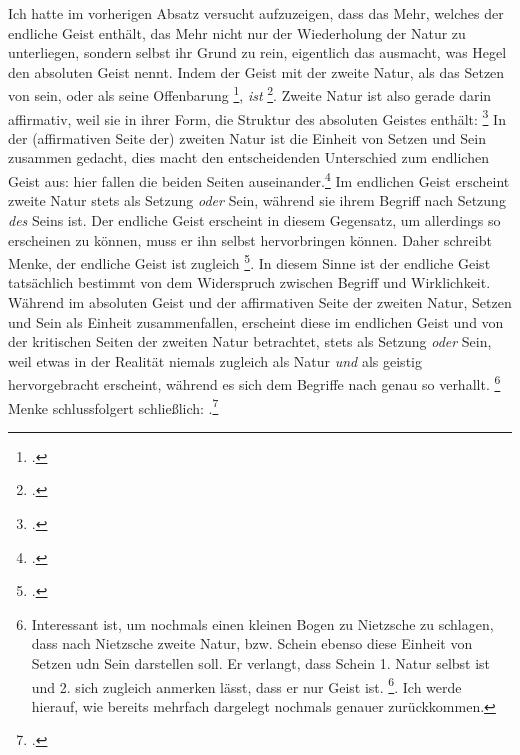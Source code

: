 \documentclass[12pt, a4paper, openany]{report}
\begin{document}
Ich hatte im vorherigen Absatz versucht aufzuzeigen, dass das Mehr, welches der endliche Geist enthält, das Mehr nicht nur der Wiederholung der Natur zu unterliegen, sondern selbst ihr Grund zu rein, eigentlich das ausmacht, was Hegel den absoluten Geist nennt.
Indem der Geist mit der zweite Natur, als das Setzen von sein, oder als seine Offenbarung \footcite[][§ 384, S. 29]{hegel_enzyklopädie_1969}, \emph{ist} \footcite[][144]{menke_autonomie_2018}.
Zweite Natur ist also gerade darin affirmativ, weil sie in ihrer Form, die Struktur des absoluten Geistes enthält: 
\footcite[][§ 384, S. 29]{hegel_enzyklopädie_1969}
In der (affirmativen Seite der) zweiten Natur ist die Einheit von Setzen und Sein zusammen gedacht, dies macht den entscheidenden Unterschied zum endlichen Geist aus: hier fallen die beiden Seiten auseinander.\footcite[Vgl.][S. 143 - S. 144]{menke_autonomie_2018}
Im endlichen Geist erscheint zweite Natur stets als Setzung \emph{oder} Sein, während sie ihrem Begriff nach Setzung \emph{des} Seins ist. 
Der endliche Geist erscheint in diesem Gegensatz, um allerdings so erscheinen zu können, muss er ihn selbst hervorbringen können. 
Daher schreibt Menke, der endliche Geist ist zugleich \footcite[][144]{menke_autonomie_2018}.
In diesem Sinne ist der endliche Geist tatsächlich bestimmt von dem Widerspruch zwischen Begriff und Wirklichkeit. 
Während im absoluten Geist und der affirmativen Seite der zweiten Natur, Setzen und Sein  als Einheit zusammenfallen, erscheint diese im endlichen Geist und von der kritischen Seiten der zweiten Natur betrachtet, stets als Setzung \emph{oder} Sein, weil etwas in der Realität niemals zugleich als Natur \emph{und} als geistig hervorgebracht erscheint, während es sich dem Begriffe nach genau so verhallt.
\footnote{
    Interessant ist, um nochmals einen kleinen Bogen zu Nietzsche zu schlagen, dass nach Nietzsche zweite Natur, bzw. Schein ebenso diese Einheit von Setzen udn Sein darstellen soll.
    Er verlangt, dass Schein 1. Natur selbst ist und 2. sich zugleich anmerken lässt, dass er nur Geist ist. \footcite[Vgl.][§ 54, S. 417]{nietzsche_morgenrote_1999}. 
    Ich werde hierauf, wie bereits mehrfach dargelegt nochmals genauer zurückkommen.
}
Menke schlussfolgert schließlich: 
.\footcite[][144]{menke_autonomie_2018}
\end{document}
